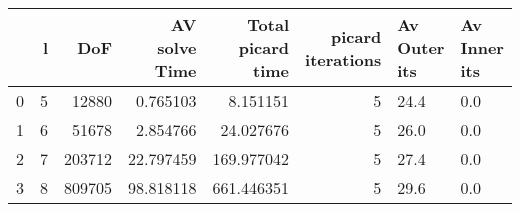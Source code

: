 \begin{tabular}{lrrrrrll}
\toprule
{} &  l &     DoF &  AV solve Time &  Total picard time &  picard iterations & Av Outer its & Av Inner its \\
\midrule
0 &  5 &   12880 &       0.765103 &           8.151151 &                  5 &         24.4 &          0.0 \\
1 &  6 &   51678 &       2.854766 &          24.027676 &                  5 &         26.0 &          0.0 \\
2 &  7 &  203712 &      22.797459 &         169.977042 &                  5 &         27.4 &          0.0 \\
3 &  8 &  809705 &      98.818118 &         661.446351 &                  5 &         29.6 &          0.0 \\
\bottomrule
\end{tabular}
